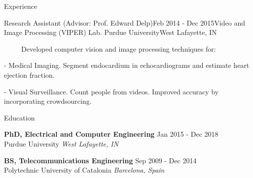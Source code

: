 \documentclass{resume} %
\begin{document}
\begin{rSection}{Experience}
\begin{rSubsection}{Research Assistant ({\normalfont Advisor}: Prof. Edward Delp)}{Feb 2014 - Dec 2015}{Video and Image Processing (VIPER) Lab. Purdue University}{West Lafayette, IN}
\item[]~~~~~Developed computer vision and image processing techniques for:
\setlength{\itemindent}{.3in}
\item[-] Medical Imaging. Segment endocardium in echocardiograms and estimate heart ejection fraction.
\item[-] Visual Surveillance. Count people from videos. Improved accuracy by incorporating crowdsourcing.
\end{rSubsection}

\vspace{-1pt}

\end{rSection}


\begin{rSection}{Education}

{\bf PhD, Electrical and Computer Engineering} \hfill {Jan 2015 - Dec 2018} \\
Purdue University \hfill {\em West Lafayette, IN\\}


{\bf BS, Telecommunications Engineering} \hfill {Sep 2009 - Dec 2014} \\ 
Polytechnic University of Catalonia \hfill {\em Barcelona, Spain}

\vspace{-1pt}

\end{rSection}

\end{document}

